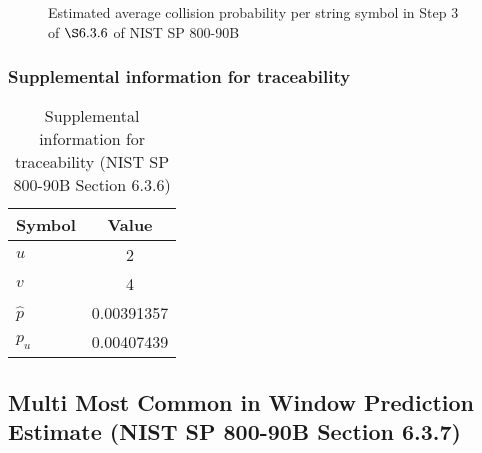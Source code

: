 \documentclass[a3paper,xelatex,english]{bxjsarticle}
\begin{document}
\begin{figure}[htbp]
\centering


\caption{Estimated average collision probability per string symbol in Step 3 of $\S6.3.6$ of NIST SP 800-90B}
\end{figure}
\clearpage
\subsubsection{Supplemental information for traceability}
\renewcommand{\arraystretch}{1.8}
\begin{table}[h]
\caption{Supplemental information for traceability (NIST SP 800-90B Section 6.3.6)}
\begin{center}
\begin{tabular}{|l|c|}
\hline 
\rowcolor{anotherlightblue} %
Symbol				& Value \\ \hline 
$u$				&        2\\ \hline 
$v$				&        4\\ \hline 
$\hat{p}$ 			& 0.00391357\\ \hline
$p_u$				& 0.00407439\\ \hline
\end{tabular}
\end{center}
\end{table}
\renewcommand{\arraystretch}{1.4}
\clearpage
\subsection{Multi Most Common in Window Prediction Estimate (NIST SP 800-90B Section 6.3.7)}\label{sec:NonBinary637}
\end{document}
